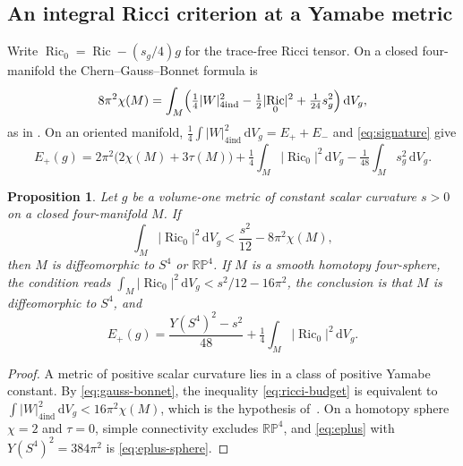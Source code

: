 \documentclass[11pt]{article}
\numberwithin{equation}{section}
\newtheorem{proposition}[theorem]{Proposition}
\DeclareMathOperator{\Ric}{Ric}
\newcommand{\dd}{\mathrm{d}}
\newcommand{\Sphere}{S^4}
\newcommand{\abs}[1]{\lvert #1\rvert}
\newcommand{\dv}{\dd V_g}
\begin{document}
\subsection{An integral Ricci criterion at a Yamabe metric}
\label{sec:budget}

Write \(\Ric_0=\Ric-(s_g/4)g\) for the trace-free Ricci tensor. On a
closed four-manifold the Chern--Gauss--Bonnet formula is
\begin{equation}\label{eq:gauss-bonnet}
 8\pi^2\chi(M)=\int_M\Bigl(\tfrac14\abs{W}_{4\mathrm{ind}}^2
   -\tfrac12\abs{\Ric_0}^2+\tfrac1{24}s_g^2\Bigr)\,\dv ,
\end{equation}
as in \cite[Eq.~(1.2)]{ChangQingYang2006Gap}. On an oriented manifold,
\(\tfrac14\int\abs{W}_{4\mathrm{ind}}^2\,\dv=E_++E_-\) and
\eqref{eq:signature} give
\begin{equation}\label{eq:eplus}
 E_+(g)=2\pi^2\bigl(2\chi(M)+3\tau(M)\bigr)
   +\tfrac14\int_M\abs{\Ric_0}^2\,\dv-\tfrac1{48}\int_Ms_g^2\,\dv .
\end{equation}

\begin{proposition}\label{prop:budget}
Let \(g\) be a volume-one metric of constant scalar curvature \(s>0\)
on a closed four-manifold \(M\). If
\begin{equation}\label{eq:ricci-budget}
 \int_M\abs{\Ric_0}^2\,\dv<\frac{s^2}{12}-8\pi^2\chi(M),
\end{equation}
then \(M\) is diffeomorphic to \(\Sphere\) or \(\mathbb{RP}^4\). If
\(M\) is a smooth homotopy four-sphere, the condition reads
\(\int_M\abs{\Ric_0}^2\,\dv<s^2/12-16\pi^2\), the conclusion is that
\(M\) is diffeomorphic to \(\Sphere\), and
\begin{equation}\label{eq:eplus-sphere}
 E_+(g)=\frac{Y(\Sphere)^2-s^2}{48}
        +\tfrac14\int_M\abs{\Ric_0}^2\,\dv .
\end{equation}
\end{proposition}

\begin{proof}
A metric of positive scalar curvature lies in a class of positive
Yamabe constant. By \eqref{eq:gauss-bonnet}, the inequality
\eqref{eq:ricci-budget} is equivalent to
\(\int\abs{W}_{4\mathrm{ind}}^2\,\dv<16\pi^2\chi(M)\), which is the
hypothesis of~\cite[Theorem~A]{ChangGurskyYang2003}. On a homotopy
sphere \(\chi=2\) and \(\tau=0\), simple connectivity excludes
\(\mathbb{RP}^4\), and \eqref{eq:eplus} with
\(Y(\Sphere)^2=384\pi^2\) is \eqref{eq:eplus-sphere}.
\end{proof}
\end{document}
